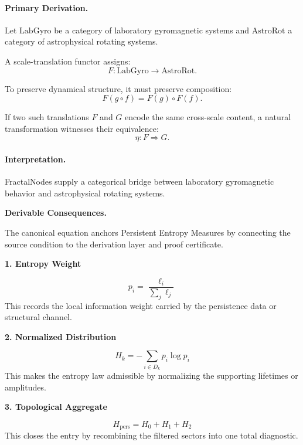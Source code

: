 \paragraph{Primary Derivation.}
Let $\mathrm{LabGyro}$ be a category of laboratory gyromagnetic systems and $\mathrm{AstroRot}$ a category of astrophysical rotating systems.

A scale-translation functor assigns:
\begin{equation}
F:\mathrm{LabGyro}\to\mathrm{AstroRot}.
\end{equation}

To preserve dynamical structure, it must preserve composition:
\begin{equation}
F(g\circ f)=F(g)\circ F(f).
\end{equation}

If two such translations $F$ and $G$ encode the same cross-scale content, a natural transformation witnesses their equivalence:
\begin{equation}
\boxed{
\eta:F\Rightarrow G .
}
\end{equation}

\paragraph{Interpretation.}
FractalNodes supply a categorical bridge between laboratory gyromagnetic behavior and astrophysical rotating systems.

\par\vspace{0.35em}
\noindent\textbf{Derivable Consequences.}\quad
\begingroup
\footnotesize
\raggedright
The canonical equation anchors Persistent Entropy Measures by connecting the source condition to the derivation layer and proof certificate.
\par\endgroup

\noindent\textbf{1. Entropy Weight}\par
\[
p_i=\frac{\ell_i}{\sum_j \ell_j}
\]
\noindent This records the local information weight carried by the persistence data or structural channel.\par
\noindent\textbf{2. Normalized Distribution}\par
\[
H_k=-\sum_{i\in D_k}p_i\log p_i
\]
\noindent This makes the entropy law admissible by normalizing the supporting lifetimes or amplitudes.\par
\noindent\textbf{3. Topological Aggregate}\par
\[
H_{\mathrm{pers}}=H_0+H_1+H_2
\]
\noindent This closes the entry by recombining the filtered sectors into one total diagnostic.\par

